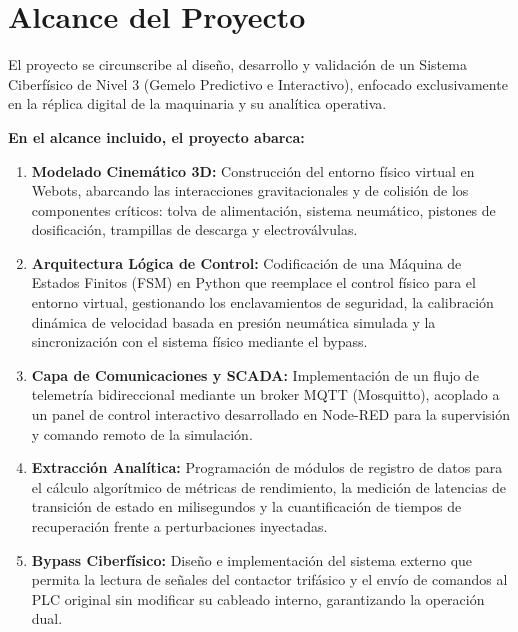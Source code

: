 \section{Alcance del Proyecto}

El proyecto se circunscribe al diseño, desarrollo y validación de un Sistema Ciberfísico de Nivel 3 (Gemelo Predictivo e Interactivo), enfocado exclusivamente en la réplica digital de la maquinaria y su analítica operativa.

\textbf{En el alcance incluido, el proyecto abarca:}
\begin{enumerate}
  \item \textbf{Modelado Cinemático 3D:} Construcción del entorno físico virtual en Webots, abarcando las interacciones gravitacionales y de colisión de los componentes críticos: tolva de alimentación, sistema neumático, pistones de dosificación, trampillas de descarga y electroválvulas.
  \item \textbf{Arquitectura Lógica de Control:} Codificación de una Máquina de Estados Finitos (FSM) en Python que reemplace el control físico para el entorno virtual, gestionando los enclavamientos de seguridad, la calibración dinámica de velocidad basada en presión neumática simulada y la sincronización con el sistema físico mediante el bypass.
  \item \textbf{Capa de Comunicaciones y SCADA:} Implementación de un flujo de telemetría bidireccional mediante un broker MQTT (Mosquitto), acoplado a un panel de control interactivo desarrollado en Node-RED para la supervisión y comando remoto de la simulación.
  \item \textbf{Extracción Analítica:} Programación de módulos de registro de datos para el cálculo algorítmico de métricas de rendimiento, la medición de latencias de transición de estado en milisegundos y la cuantificación de tiempos de recuperación frente a perturbaciones inyectadas.
  \item \textbf{Bypass Ciberfísico:} Diseño e implementación del sistema externo que permita la lectura de señales del contactor trifásico y el envío de comandos al PLC original sin modificar su cableado interno, garantizando la operación dual.
\end{enumerate}

